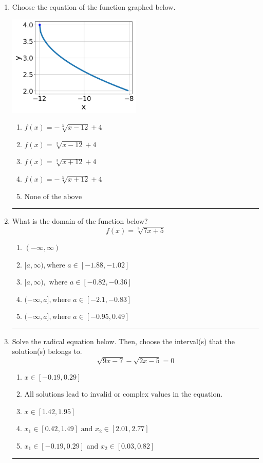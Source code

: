 \documentclass[14pt]{extbook}
\newcommand{\litem}[1]{\item#1\hspace*{-1cm}\rule{\textwidth}{0.4pt}}
\begin{document}
\begin{enumerate}
{\begin{enumerate}[label=\Alph*.]
\end{enumerate} }
\litem{
Choose the equation of the function graphed below.
\begin{center}
    \includegraphics[width=0.5\textwidth]{../Figures/radicalGraphToEquationC.png}
\end{center}
\begin{enumerate}[label=\Alph*.]
\item \( f(x) = - \sqrt[3]{x - 12} + 4 \)
\item \( f(x) = \sqrt[3]{x - 12} + 4 \)
\item \( f(x) = \sqrt[3]{x + 12} + 4 \)
\item \( f(x) = - \sqrt[3]{x + 12} + 4 \)
\item \( \text{None of the above} \)

\end{enumerate} }
\litem{
What is the domain of the function below?\[ f(x) = \sqrt[8]{7 x + 5} \]\begin{enumerate}[label=\Alph*.]
\item \( (-\infty, \infty) \)
\item \( [a, \infty), \text{where } a \in [-1.88, -1.02] \)
\item \( [a, \infty), \text{ where } a \in [-0.82, -0.36] \)
\item \( (-\infty, a], \text{where } a \in [-2.1, -0.83] \)
\item \( (-\infty, a], \text{where } a \in [-0.95, 0.49] \)

\end{enumerate} }
\litem{
Solve the radical equation below. Then, choose the interval(s) that the solution(s) belongs to.\[ \sqrt{9 x - 7} - \sqrt{2 x - 5} = 0 \]\begin{enumerate}[label=\Alph*.]
\item \( x \in [-0.19,0.29] \)
\item \( \text{All solutions lead to invalid or complex values in the equation.} \)
\item \( x \in [1.42,1.95] \)
\item \( x_1 \in [0.42, 1.49] \text{ and } x_2 \in [2.01,2.77] \)
\item \( x_1 \in [-0.19, 0.29] \text{ and } x_2 \in [0.03,0.82] \)


\end{enumerate}}
\end{enumerate}
\end{document}
